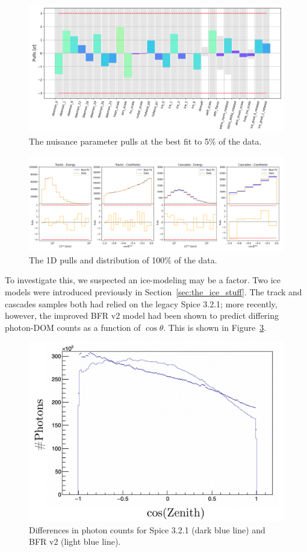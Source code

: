 \documentclass[main.tex]{subfiles}
\begin{document}
\begin{figure}
    \centering
    \includegraphics[width=0.9\linewidth]{./figures/pulls_IC86_data_full_joint_data_full.png}
    \caption{The nuisance parameter pulls at the best fit to 5\% of the data.}\label{fig:pulls_100p}
\end{figure}


\begin{figure}
    \centering
    \includegraphics[width=0.9\linewidth]{./figures/goodness_joint_data_full_IC86_data_full.png}
    \caption{The 1D pulls and distribution of 100\% of the data.}\label{fig:1d_100p_distrib}
\end{figure}


To investigate this, we suspected an ice-modeling may be a factor.
Two ice models were introduced previously in Section~\ref{sec:the_ice_stuff}.
The track and cascades samples both had relied on the legacy Spice 3.2.1; more recently, however, the improved BFR v2 model had been shown to predict differing photon-DOM counts as a function of $\cos\theta$.  
This is shown in Figure~\ref{fig:zenith_bfr}.

\begin{figure}
    \centering
    \includegraphics[width=0.75\linewidth]{./figures/ice_investigate/zenith_bfr.png}
    \caption{Differences in photon counts for Spice 3.2.1 (dark blue line) and BFR v2 (light blue line).}\label{fig:zenith_bfr}
\end{figure}
\end{document}
